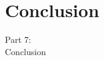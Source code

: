 \section{Conclusion}
\begin{frame}[fragile]
  \vspace{25mm}
  \begin{center}
    \Huge{Part 7:\\Conclusion}
  \end{center}
\end{frame}
